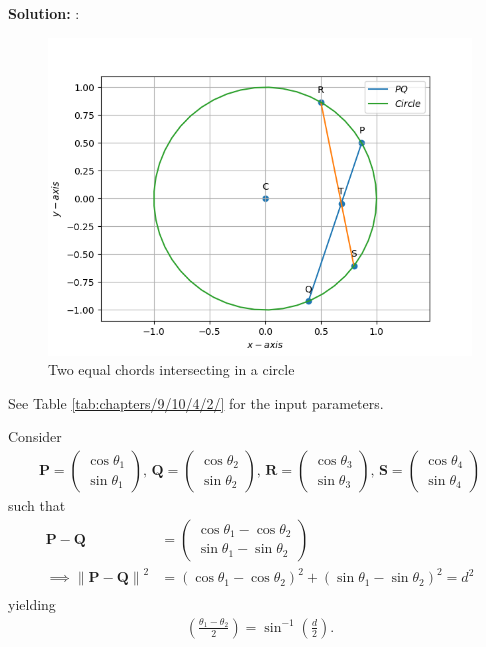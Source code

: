 \documentclass[10pt]{article}
\providecommand{\brak}[1]{\ensuremath{\left(#1\right)}}
\providecommand{\norm}[1]{\left\lVert#1\right\rVert}
\newcommand{\solution}{\noindent \textbf{Solution: }}
\newcommand{\myvec}[1]{\ensuremath{\begin{pmatrix}#1\end{pmatrix}}}
\let\vec\mathbf
\begin{document}
\begin{enumerate}
\solution:
\fi
\begin{figure}[h!]
	\begin{center} 
	  \includegraphics[width=\columnwidth]{chapters/9/10/4/2/figs/c.png}
	\end{center}
\caption{Two equal chords intersecting in a circle}
\label{fig:chapters/9/10/4/2/Fig1}
\end{figure} 
See Table 
\ref{tab:chapters/9/10/4/2/}
for the input  parameters.
\begin{table}[h!]
	
\caption{}
\label{tab:chapters/9/10/4/2/}
\end{table}
Consider
\begin{align}
\vec{P}=\myvec{\cos \theta_1\\\sin \theta_1},\,
\vec{Q}=\myvec{\cos \theta_2\\\sin \theta_2},\,
\vec{R}=\myvec{\cos \theta_3\\\sin \theta_3},\,
\vec{S}=\myvec{\cos \theta_4\\\sin \theta_4}
\label{eq:chapters/9/10/4/2/table1}
\end{align}
such that 
\begin{align}
	\vec{P}-\vec{Q}&=\myvec{\cos\theta_1-\cos\theta_2 \\ \sin \theta_1-\sin \theta_2}
	\\
	\implies \norm{\vec{P}-\vec{Q}}^2 &= 
	\brak{\cos \theta_1-\cos \theta_2}^2+\brak{\sin \theta_1-\sin \theta_2}^2=d^2\\
\end{align}
yielding
\begin{align}
	\brak{\frac{\theta_1-\theta_2}{2}}=\sin^{-1}\brak{\frac{d}{2}}.

\end{align}
\end{enumerate}
\end{document}
